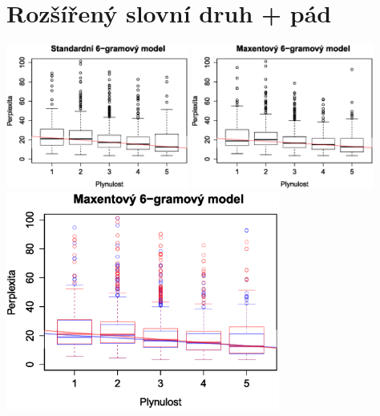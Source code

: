 \documentclass[12pt,a4paper]{report}
\begin{document}
\section{Rozšířený slovní druh + pád}
\begin{center}
	\includegraphics[width=60mm]{./grafy/morf/ngram/rsd+pad.svg.eps}
	\includegraphics[width=60mm]{./grafy/morf/maxent/rsd+pad.svg.eps}
	\includegraphics[width=90mm]{./grafy/morf/porovnani/rsd+pad.svg.eps}	
\end{center}
\end{document}
